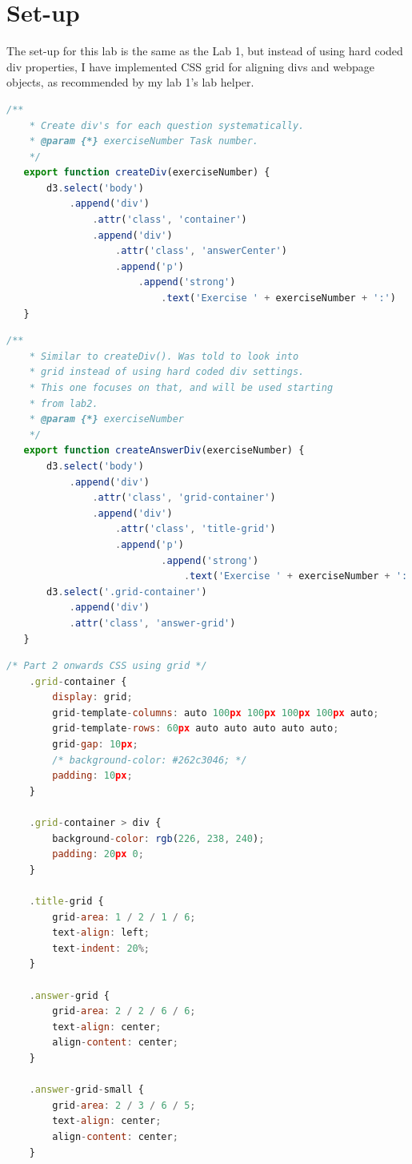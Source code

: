 \documentclass{scrreprt}
\begin{document}
\section{Set-up}
The set-up for this lab is the same as the Lab 1, but instead of using hard coded div properties, I have implemented CSS grid for aligning divs and webpage objects, as recommended by my lab 1's lab helper. 
\begin{lstlisting}[language=JavaScript,
    caption={Old Method},
    captionpos=b,
    label={lst:Olddiv}]
    /**
    * Create div's for each question systematically.
    * @param {*} exerciseNumber Task number.
    */
   export function createDiv(exerciseNumber) {
       d3.select('body')
           .append('div')
               .attr('class', 'container')
               .append('div')
                   .attr('class', 'answerCenter')
                   .append('p')
                       .append('strong')
                           .text('Exercise ' + exerciseNumber + ':')
   }
\end{lstlisting}
\begin{lstlisting}[language=JavaScript,
    caption={New Method},
    captionpos=b,
    label={lst:newDiv}]
    /**
    * Similar to createDiv(). Was told to look into 
    * grid instead of using hard coded div settings.
    * This one focuses on that, and will be used starting 
    * from lab2.
    * @param {*} exerciseNumber 
    */
   export function createAnswerDiv(exerciseNumber) {
       d3.select('body')
           .append('div')
               .attr('class', 'grid-container')
               .append('div')
                   .attr('class', 'title-grid')
                   .append('p')
                           .append('strong')
                               .text('Exercise ' + exerciseNumber + ':')
       d3.select('.grid-container')
           .append('div')
           .attr('class', 'answer-grid')
   }
\end{lstlisting}
\begin{lstlisting}[language=JavaScript,
    caption={New CSS Method},
    captionpos=b,
    label={lst:newCSS}]
    /* Part 2 onwards CSS using grid */
    .grid-container {
        display: grid;
        grid-template-columns: auto 100px 100px 100px 100px auto;
        grid-template-rows: 60px auto auto auto auto auto;
        grid-gap: 10px;
        /* background-color: #262c3046; */
        padding: 10px;
    }
    
    .grid-container > div {
        background-color: rgb(226, 238, 240);
        padding: 20px 0;
    }
    
    .title-grid {
        grid-area: 1 / 2 / 1 / 6;
        text-align: left;
        text-indent: 20%;
    }
    
    .answer-grid {
        grid-area: 2 / 2 / 6 / 6;
        text-align: center;
        align-content: center;
    }
    
    .answer-grid-small {
        grid-area: 2 / 3 / 6 / 5;
        text-align: center;
        align-content: center;
    }
\end{lstlisting}
\end{document}
